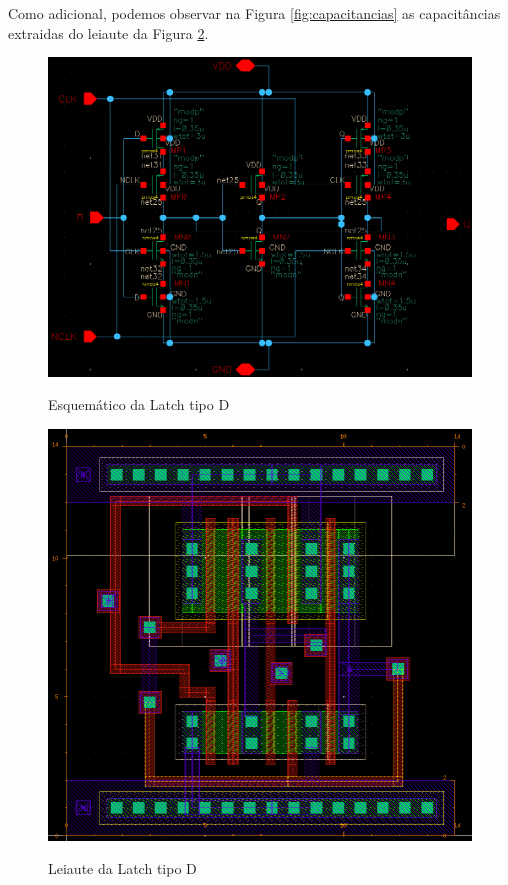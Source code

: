 \documentclass{iiufrgs}
\begin{document}
Como adicional, podemos observar na Figura \ref{fig:capacitancias} as capacitâncias extraidas do leiaute da Figura \ref{fig:leiaute}.

\begin{figure}[htbp]
    \centering
    \caption{Esquemático da Latch tipo D}
    \includegraphics[scale=0.55]{images/schem_transistor.png}
    \label{fig:esquematico}
\end{figure}

\begin{figure}[htbp]
    \centering
    \caption{Leiaute da Latch tipo D}
    \includegraphics[scale=0.65]{images/lay.png}
    \label{fig:leiaute}
\end{figure}
\end{document}
